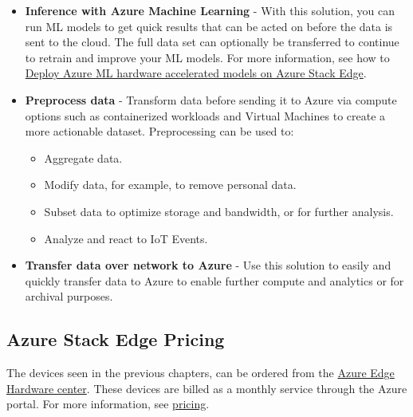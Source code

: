 \documentclass[a4paper]{article}
\begin{document}
    \begin{itemize}
        \item \textbf{Inference with Azure Machine Learning} - With this solution, you can run ML models to get quick results that can be acted on before the data is sent to the cloud. The full data set can optionally be transferred to continue to retrain and improve your ML models. For more information, see how to \href{https://learn.microsoft.com/en-us/azure/machine-learning/how-to-deploy-fpga-web-service#deploy-to-a-local-edge-server}{Deploy Azure ML hardware accelerated models on Azure Stack Edge}.

        \item \textbf{Preprocess data} - Transform data before sending it to Azure via compute options such as containerized workloads and Virtual Machines to create a more actionable dataset. Preprocessing can be used to:
        \begin{itemize}
            \item Aggregate data.
            \item Modify data, for example, to remove personal data.
            \item Subset data to optimize storage and bandwidth, or for further analysis.
            \item Analyze and react to IoT Events.
        \end{itemize}

        \item \textbf{Transfer data over network to Azure} - Use this solution to easily and quickly transfer data to Azure to enable further compute and analytics or for archival purposes.
    \end{itemize}

    \newpage

    \subsection{Azure Stack Edge Pricing}\label{subsection: azure stack edge pricing}

    The devices seen in the previous chapters, can be ordered from the \href{https://learn.microsoft.com/en-us/azure/azure-edge-hardware-center/azure-edge-hardware-center-overview}{Azure Edge Hardware center}. These devices are billed as a monthly service through the Azure portal. For more information, see \href{https://azure.microsoft.com/en-gb/pricing/details/azure-stack/edge/#pricing}{pricing}.
\end{document}
